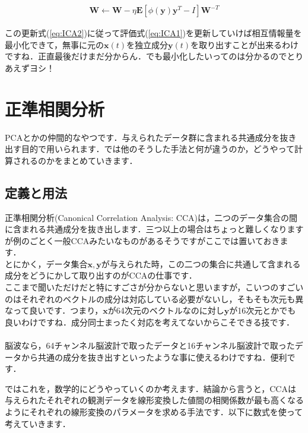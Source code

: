 \documentclass[11pt,a4paper,uplatex]{ujreport}
\begin{document}
\begin{eqnarray}
\label{eq:ICA3}
\mathbf{W} \leftarrow \mathbf{W} - \eta \mathbf{E}[\phi (\mathbf{y})\mathbf{y}^T - I]\mathbf{W}^{-T}
\end{eqnarray}

この更新式(\ref{eq:ICA2})に従って評価式(\ref{eq:ICA1})を更新していけば相互情報量を最小化できて，無事に元の$\mathbf{x}(t)$を独立成分$\mathbf{y}(t)$を取り出すことが出来るわけですね．正直最後だけまだ分からん．でも最小化したいってのは分かるのでとりあえずヨシ！

\section{正準相関分析}
PCAとかの仲間的なやつです．与えられたデータ群に含まれる共通成分を抜き出す目的で用いられます．では他のそうした手法と何が違うのか，どうやって計算されるのかをまとめていきます．\\

\subsection{定義と用法}
正準相関分析(Canonical Correlation Analysis: CCA)は，二つのデータ集合の間に含まれる共通成分を抜き出します．三つ以上の場合はちょっと難しくなりますが例のごとく一般CCAみたいなものがあるそうですがここでは置いておきます．\\

とにかく，データ集合$\bm{x}, \bm{y}$が与えられた時，この二つの集合に共通して含まれる成分をどうにかして取り出すのがCCAの仕事です．\\

ここまで聞いただけだと特にすごさが分からないと思いますが，こいつのすごいのはそれぞれのベクトルの成分は対応している必要がないし，そもそも次元も異なって良いです．つまり，$\bm{x}$が64次元のベクトルなのに対し$\bm{y}$が16次元とかでも良いわけですね．成分同士まったく対応を考えてないからこそできる技です．\\
\\

脳波なら，64チャンネル脳波計で取ったデータと16チャンネル脳波計で取ったデータから共通の成分を抜き出すといったような事に使えるわけですね．便利です．

ではこれを，数学的にどうやっていくのか考えます．結論から言うと，CCAは与えられたそれぞれの観測データを線形変換した値間の相関係数が最も高くなるようにそれぞれの線形変換のパラメータを求める手法です．以下に数式を使って考えていきます．
\end{document}
